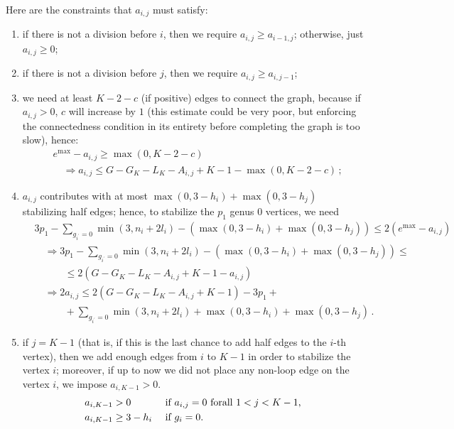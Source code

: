 \documentclass{amsart}
\theoremstyle{plain}
\theoremstyle{definition}
\DeclareMathOperator{\MAX}{max}
\begin{document}
Here are the constraints that $a_{i,j}$ must satisfy:
\begin{enumerate}
\item if there is not a division before $i$, then we require $a_{i,j}
  \geq a_{i-1,j}$; otherwise, just $a_{i,j} \geq 0$;
\item if there is not a division before $j$, then we require $a_{i,j}
  \geq a_{i,j-1}$;
\item we need at least $K-2-c$ (if positive) edges to connect the
  graph, because if $a_{i,j} > 0$, $c$ will increase by $1$ (this
  estimate could be very poor, but enforcing the connectedness
  condition in its entirety before completing the graph is too slow),
  hence:
  \begin{align*}
    &e^{\MAX} - a_{i,j} \geq \max(0, K-2-c)\\
    &\quad\Rightarrow a_{i,j} \leq G - G_K - L_K - A_{i,j} +K - 1 - \max(0, K-2-c)\,\text{;}
  \end{align*}
\item $a_{i,j}$ contributes with at most $\max(0, 3-h_i) + \max(0,
  3-h_j)$ stabilizing half edges; hence, to stabilize the $p_1$ genus
  $0$ vertices, we need
  \begin{align*}
    &3p_1 - \sum_{g_{i^\prime} = 0} \min(3, n_i + 2l_i) - (\max(0, 3-h_i) + \max(0, 3-h_j)) \leq 2 (e^{\MAX} - a_{i,j})\\
    &\quad\Rightarrow 3p_1 - \sum_{g_{i^\prime} = 0} \min(3, n_i + 2l_i) - (\max(0, 3-h_i) + \max(0, 3-h_j)) \leq \\
    &\quad\quad\quad \leq 2 (G - G_K - L_K - A_{i,j} + K - 1 - a_{i,j})\\
    &\quad\Rightarrow 2a_{i,j} \leq 2 (G - G_K - L_K - A_{i,j} + K - 1) - 3p_1 +\\
    &\quad\quad\quad +\sum_{g_{i^\prime} = 0} \min(3, n_i + 2l_i) + \max(0, 3-h_i) + \max(0, 3-h_j)\,\text{.}
  \end{align*}
\item if $j = K-1$ (that is, if this is the last chance to add half
  edges to the $i$-th vertex), then we add enough edges from $i$ to
  $K-1$ in order to stabilize the vertex $i$; moreover, if up to now
  we did not place any non-loop edge on the vertex $i$, we impose
  $a_{i,K-1} > 0$.
  \begin{align*}
    a_{i,K-1}&>0  &&\text{ if $ a_{i,j} = 0$ forall $1<j<K-1$,}\\
    a_{i,K-1}&\geq 3-h_i &&\text{ if $g_i = 0$.}
  \end{align*}
\end{enumerate}
\end{document}

